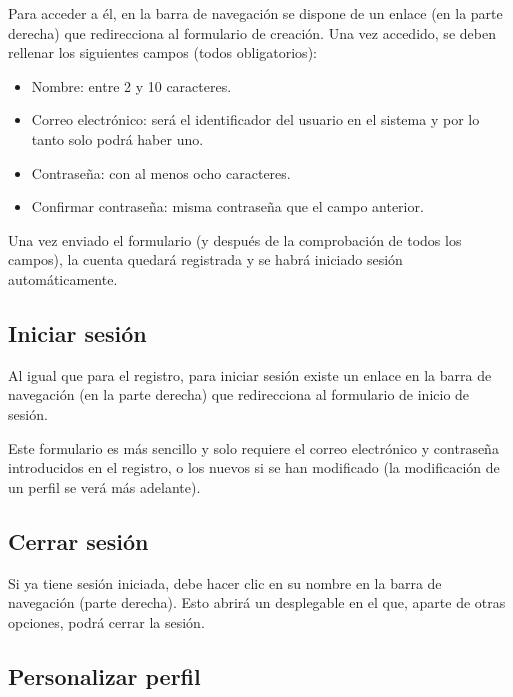 Para acceder a él, en la barra de navegación se dispone de un enlace (en la
parte derecha) que redirecciona al formulario de creación. Una vez accedido, se
deben rellenar los siguientes campos (todos obligatorios):
\begin{itemize}
    \item Nombre: entre 2 y 10 caracteres.
    \item Correo electrónico: será el identificador del usuario en el sistema y
    por lo tanto solo podrá haber uno.
    \item Contraseña: con al menos ocho caracteres.
    \item Confirmar contraseña: misma contraseña que el campo anterior.
\end{itemize}


Una vez enviado el formulario (y después de la comprobación de todos los
campos), la cuenta quedará registrada y se habrá iniciado sesión
automáticamente.

\subsection{Iniciar sesión}

Al igual que para el registro, para iniciar sesión existe un enlace en la barra
de navegación (en la parte derecha) que redirecciona al formulario de inicio de
sesión.


Este formulario es más sencillo y solo requiere el correo electrónico y
contraseña introducidos en el registro, o los nuevos si se han modificado (la
modificación de un perfil se verá más adelante).

\subsection{Cerrar sesión}

Si ya tiene sesión iniciada, debe hacer clic en su nombre en la barra de
navegación (parte derecha). Esto abrirá un desplegable en el que, aparte de
otras opciones, podrá cerrar la sesión.


\subsection{Personalizar perfil}


